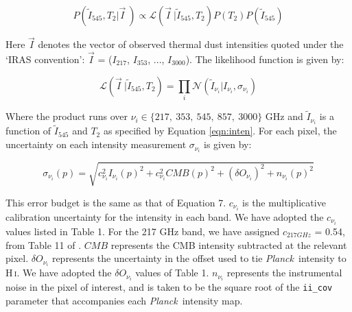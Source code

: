 \documentclass{emulateapj}
\newcommand{\PLANCK}{{\it Planck}}
\begin{document}

\begin{equation}
\label{eqn:post}
P(\tilde{I}_{545}, T_2|\vec{I}~) \propto \mathcal{L}(\vec{I}~|\tilde{I}_{545}, T_2)P(T_2)P(\tilde{I}_{545})
\end{equation}


Here $\vec{I}$ denotes the vector of observed thermal dust intensities quoted 
under the `IRAS convention': $\vec{I}$ = ($I_{217}$, $I_{353}$, ..., 
$I_{3000}$). The likelihood function is given by:

\begin{equation} \label{equ:like}
\mathcal{L}(\vec{I}~|\tilde{I}_{545}, T_2) = \displaystyle\prod\limits_{i}\mathcal{N}(\tilde{I}_{\nu_{i}}|I_{\nu_{i}}, \sigma_{\nu_i})
\end{equation}


Where the product runs over $\nu_i$$\in$$\{217,\ 353,\ 545,\ 857,\ 3000\}$ GHz
and $\tilde{I}_{\nu_i}$ is a function of $\tilde{I}_{545}$ and $T_2$ as 
specified by Equation \ref{eqn:inten}. For each pixel, the uncertainty on each 
intensity measurement $\sigma_{\nu_i}$ is given by:

\begin{equation}
\sigma_{\nu_i}(p) = \sqrt{c^2_{\nu_i}I_{\nu_i}(p)^2 + c^2_{\nu_i}CMB(p)^2 + (\delta O_{\nu_i})^2 + n_{\nu_i}(p)^2}
\end{equation}


This error budget is the same as that of \cite{planckdust} Equation 7. 
$c_{\nu_i}$ is the multiplicative calibration uncertainty for the intensity in 
each band. We have adopted the $c_{\nu_i}$ values listed in \cite{planckdust} 
Table 1. For the 217 GHz band, we have assigned $c_{217 GHz}$ = 0.54, from 
Table 11 of \cite{planckcalib}. $CMB$ represents the CMB intensity 
subtracted at the relevant pixel. $\delta O_{\nu_i}$ represents the uncertainty
in the offset used to tie \PLANCK~intensity to H\,\textsc{i}. We have adopted 
the  $\delta O_{\nu_i}$ values of \cite{planckdust} Table 1. $n_{\nu_i}$ 
represents the instrumental noise in the pixel of interest, and is taken to be 
the square root of the \verb|ii_cov| parameter that accompanies each 
\PLANCK~intensity map.
\end{document}
